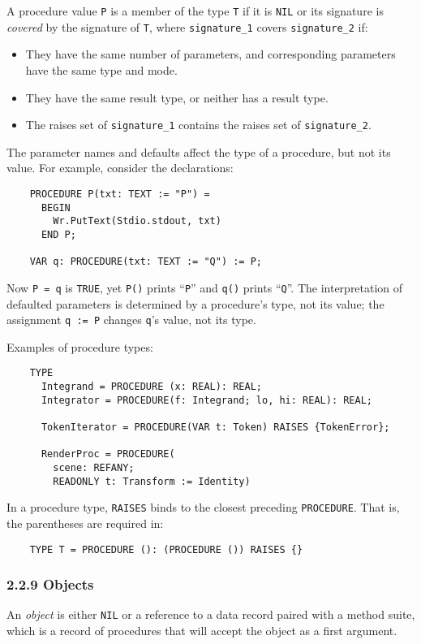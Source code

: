 \documentclass[10pt]{article}
\begin{document}
A procedure value \verb|P| is a member of the type \verb|T| if it is
\verb|NIL| or its signature is \emph{covered} by the signature of \verb|T|,
where \verb|signature_1| covers \verb|signature_2| if:
\begin{itemize}
\item They have the same number of parameters, and corresponding parameters
  have the same type and mode.
\item  They have the same result type, or neither has a result type.
\item The raises set of \verb|signature_1| contains the raises set of
  \verb|signature_2|.
\end{itemize}

The parameter names and defaults affect the type of a procedure, but not its
value.  For example, consider the declarations:
\begin{verbatim}
    PROCEDURE P(txt: TEXT := "P") =
      BEGIN
        Wr.PutText(Stdio.stdout, txt)
      END P;

    VAR q: PROCEDURE(txt: TEXT := "Q") := P;
\end{verbatim}
Now \verb|P = q| is \verb|TRUE|, yet \verb|P()| prints ``\verb|P|'' and
\verb|q()| prints ``\verb|Q|''.  The interpretation of defaulted parameters is
determined by a procedure's type, not its value; the assignment \verb|q := P|
changes \verb|q|'s value, not its type.

Examples of procedure types:
\begin{verbatim}
    TYPE
      Integrand = PROCEDURE (x: REAL): REAL;
      Integrator = PROCEDURE(f: Integrand; lo, hi: REAL): REAL;

      TokenIterator = PROCEDURE(VAR t: Token) RAISES {TokenError};

      RenderProc = PROCEDURE(
        scene: REFANY;
        READONLY t: Transform := Identity)
\end{verbatim}

In a procedure type, \verb|RAISES| binds to the closest preceding
\verb|PROCEDURE|.  That is, the parentheses are required in:
\begin{verbatim}
    TYPE T = PROCEDURE (): (PROCEDURE ()) RAISES {}
\end{verbatim}

\subsubsection*{2.2.9 Objects}

An \emph{object} is either \verb|NIL| or a reference to a data record paired
with a method suite, which is a record of procedures that will accept the
object as a first argument.
\end{document}
